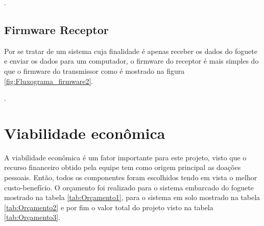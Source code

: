 .

\newpage

\subsection{Firmware Receptor}

 Por se tratar de  um sistema cuja finalidade é apenas receber os dados do foguete e enviar os dados para um computador, o firmware do receptor é mais simples do que o firmware do transmissor como é mostrado na figura \ref{fig:Fluxograma_firmware2}.

.
 
 
 


\newpage



\section{Viabilidade econômica}

 A viabilidade econômica é um fator importante para este projeto, visto que o recurso financeiro obtido pela equipe tem como origem principal as doações pessoais. Então, todos os componentes foram escolhidos tendo em vista o melhor custo-benefício. O orçamento foi realizado para o sistema embarcado do foguete mostrado na tabela \ref{tab:Orçamento1}, para o sistema em solo mostrado na tabela \ref{tab:Orçamento2} e por fim o valor total do projeto visto na tabela \ref{tab:Orçamento3}.


 



